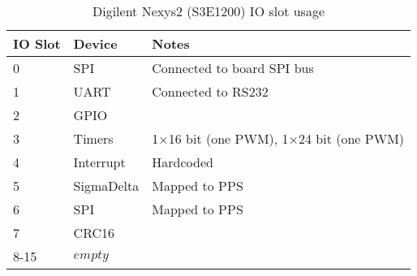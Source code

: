 \begin{table}[H]
\begin{center}
\begin{tabularx}{14cm}{llX}
IO Slot & Device & Notes \\
\hline
0 & SPI & Connected to board SPI bus \\
1 & UART & Connected to RS232 \\
2 & GPIO & \\
3 & Timers & 1$\times$16 bit (one PWM), 1$\times$24 bit (one PWM) \\
4 & Interrupt & Hardcoded \\
5 & SigmaDelta & Mapped to PPS \\
6 & SPI & Mapped to PPS \\
7 & CRC16 & \\
8-15 & $empty$ &
\end{tabularx}
\caption{Digilent Nexys2 (S3E1200) IO slot usage}
\end{center}
\end{table}
